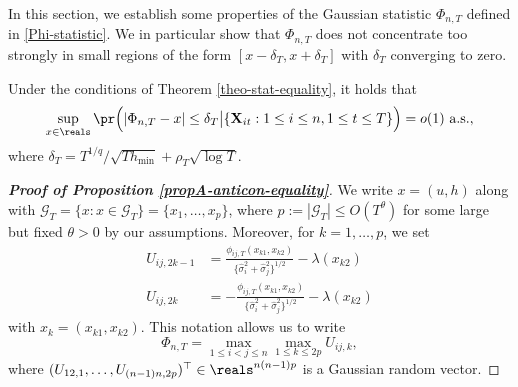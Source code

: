 In this section, we establish some properties of the Gaussian statistic $\Phi_{n,T}$ defined in \eqref{Phi-statistic}. We in particular show that $\Phi_{n,T}$ does not concentrate too strongly in small regions of the form $[x-\delta_T,x+\delta_T]$ with $\delta_T$ converging to zero.  
%
%
\begin{propA}\label{propA-anticon-equality}
Under the conditions of Theorem \ref{theo-stat-equality}, it holds that 
\[ \sup_{x \in \reals} \pr \Big( | \Phi_{n,T} - x | \le \delta_T \big| \{\mathbf{X}_{it}: 1\le i \le n, 1 \le t \le T \} \Big) = o(1) \text{ a.s.}, \]
where $\delta_T = T^{1/q} / \sqrt{T h_{\min}} + \rho_T \sqrt{\log T}$.
\end{propA}
%
%
\begin{proof}[\textnormal{\textbf{Proof of Proposition \ref{propA-anticon-equality}}}] 

We write $x = (u,h)$ along with $\mathcal{G}_T = \{ x : x \in \mathcal{G}_T \} = \{x_1,\ldots,x_p\}$, where $p := |\mathcal{G}_T| \le O(T^\theta)$ for some large but fixed $\theta > 0$ by our assumptions. Moreover, for $k = 1,\ldots,p$, we set 
\begin{align*}
U_{ij, 2k-1} & = \frac{\phi_{ij, T}(x_{k1},x_{k2})}{\{\widehat{\sigma}_i^2 + \widehat{\sigma}_j^2\}^{1/2}} - \lambda(x_{k2}) \\
U_{ij, 2k} & = -\frac{\phi_{ij, T}(x_{k1},x_{k2})}{\{\widehat{\sigma}_i^2 + \widehat{\sigma}_j^2\}^{1/2}} - \lambda(x_{k2}) 
\end{align*}
with $x_k = (x_{k1},x_{k2})$. This notation allows us to write
\[ \Phi_{n, T} = \max_{1\le i < j \le n} \max_{1 \le k \le 2p} U_{ij, k}, \]
where $(U_{12, 1},\ldots,U_{(n-1)n, 2p})^\top \in \reals^{n(n-1)p}$ is a Gaussian random vector.

\end{proof}
